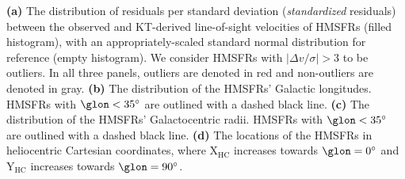 \label{fig:outliers}
\textbf{(a)} The distribution of residuals per standard deviation (\textit{standardized} residuals) between the observed and KT-derived line-of-sight velocities of HMSFRs (filled histogram), with an appropriately-scaled standard normal distribution for reference (empty histogram). We consider HMSFRs with $\vert \Delta v / \sigma \vert > 3$ to be outliers. In all three panels, outliers are denoted in red and non-outliers are denoted in gray.
\textbf{(b)} The distribution of the HMSFRs' Galactic longitudes. HMSFRs with $\glon < 35^\circ$ are outlined with a dashed black line.
\textbf{(c)} The distribution of the HMSFRs' Galactocentric radii. HMSFRs with $\glon < 35^\circ$ are outlined with a dashed black line.
\textbf{(d)} The locations of the HMSFRs in heliocentric Cartesian coordinates, where $\mathrm{X_{HC}}$ increases towards $\glon=0^\circ$ and $\mathrm{Y_{HC}}$ increases towards $\glon=90^\circ$. 

